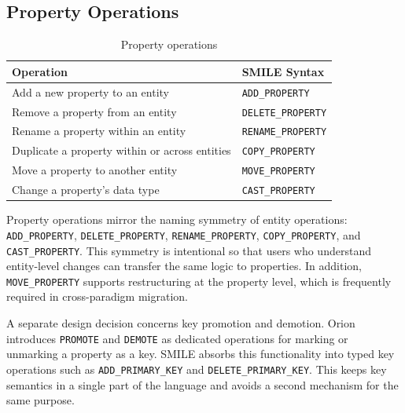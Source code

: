   \subsection{Property Operations}\label{subsec:op-property}
  \begin{table}[h]
  \centering
  \small
  \begin{tabular}{ll}
  \toprule
  \textbf{Operation} & \textbf{SMILE Syntax} \\
  \midrule
  Add a new property to an entity                 & \texttt{ADD\_PROPERTY}    \\
  Remove a property from an entity                & \texttt{DELETE\_PROPERTY} \\
  Rename a property within an entity              & \texttt{RENAME\_PROPERTY} \\
  Duplicate a property within or across entities  & \texttt{COPY\_PROPERTY}   \\
  Move a property to another entity               & \texttt{MOVE\_PROPERTY}   \\
  Change a property's data type                   & \texttt{CAST\_PROPERTY}   \\
  \bottomrule
  \end{tabular}
  \caption{Property operations}
  \label{tab:ops-property}
  \end{table}
  Property operations mirror the naming symmetry of entity operations: \texttt{ADD\_PROPERTY}, \texttt{DELETE\_PROPERTY},
  \texttt{RENAME\_PROPERTY}, \texttt{COPY\_PROPERTY}, and \texttt{CAST\_PROPERTY}. This symmetry is intentional so that users who understand
  entity-level changes can transfer the same logic to properties. In addition, \texttt{MOVE\_PROPERTY} supports restructuring at the property
  level, which is frequently required in cross-paradigm migration.

  A separate design decision concerns key promotion and demotion. Orion~\cite{chillon2022taxonomy} introduces \texttt{PROMOTE} and \texttt{DEMOTE}
  as dedicated operations for marking or unmarking a property as a key. SMILE  absorbs this functionality into typed key operations such as
  \texttt{ADD\_PRIMARY\_KEY} and \texttt{DELETE\_PRIMARY\_KEY}. This keeps key semantics in a single part of the language and avoids a second
  mechanism for the same purpose.

